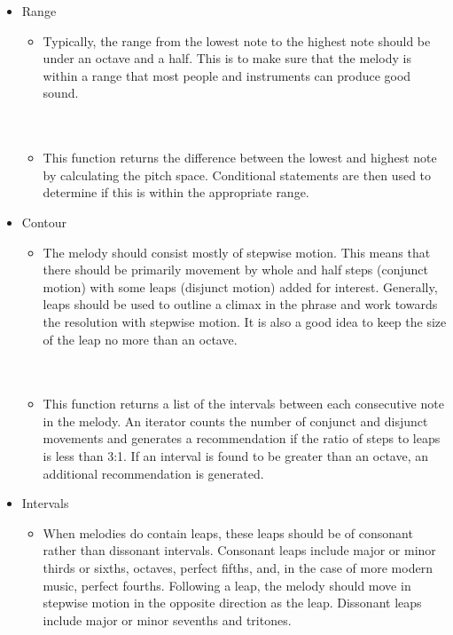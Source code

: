\begin{itemize}
	\item Range
	\begin{itemize}
		\item Typically, the range from the lowest note to the highest note should be under an octave and a half.  This is to make sure that the melody is within a range that most people and instruments can produce good sound. \\ \\
		 \\
		\item This function returns the difference between the lowest and highest note by calculating the pitch space.  Conditional statements are then used to determine if this is within the appropriate range.
	\end{itemize}
	\item Contour
	\begin{itemize}
		\item The melody should consist mostly of stepwise motion.  This means that there should be primarily movement by whole and half steps (conjunct motion) with some leaps (disjunct motion) added for interest.  Generally, leaps should be used to outline a climax in the phrase and work towards the resolution with stepwise motion.  It is also a good idea to keep the size of the leap no more than an octave. \\ \\
		 \\
		\item This function returns a list of the intervals between each consecutive note in the melody.  An iterator counts the number of conjunct and disjunct movements and generates a recommendation if the ratio of steps to leaps is less than 3:1.  If an interval is found to be greater than an octave, an additional recommendation is generated.
	\end{itemize}
	\item Intervals
	\begin{itemize}
		\item When melodies do contain leaps, these leaps should be of consonant rather than dissonant intervals.  Consonant leaps include major or minor thirds or sixths, octaves, perfect fifths, and, in the case of more modern music, perfect fourths.  Following a leap, the melody should move in stepwise motion in the opposite direction as the leap.  Dissonant leaps include major or minor sevenths and tritones. \\ \\

\end{itemize}
\end{itemize}
